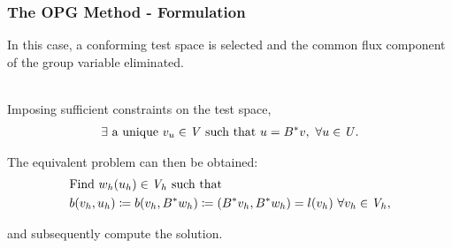 \begin{frame}
\frametitle{The OPG Method - Formulation}

In this case, a conforming test space is selected and the common flux component
of the group variable eliminated.
\\~

Imposing sufficient constraints on the test space,
\begin{align}
  \exists\ \text{a unique}\ v_u \in \mathit{{{V}}}\ \text{such that}\ u = B^*v,\ \forall u \in \mathit{{{U}}}.
\end{align}

The equivalent problem can then be obtained:
\begin{align}
& \text{Find}\ w_h(u_h) \in \mathit{{{V}}}_h\ \text{such that}\\
& b(v_h,u_h) \coloneqq b(v_h,B^*w_h) \coloneqq (B^*v_h,B^*w_h) = l(v_h)\ \forall v_h \in \mathit{{{V}}}_h,
\end{align}

and subsequently compute the solution.

\end{frame}
